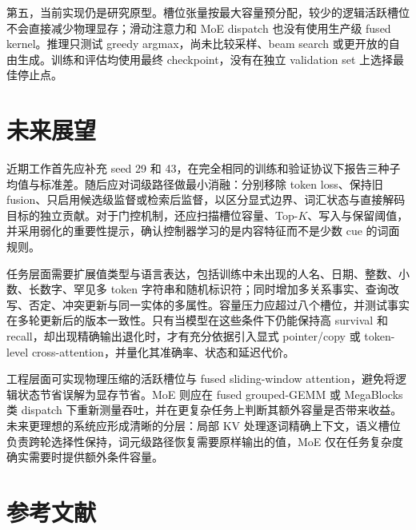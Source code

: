 \documentclass[letterpaper]{article}
\begin{document}
第五，当前实现仍是研究原型。槽位张量按最大容量预分配，较少的逻辑活跃槽位不会直接减少物理显存；滑动注意力和 MoE dispatch 也没有使用生产级 fused kernel。推理只测试 greedy argmax，尚未比较采样、beam search 或更开放的自由生成。训练和评估均使用最终 checkpoint，没有在独立 validation set 上选择最佳停止点。

\section{未来展望}

近期工作首先应补充 seed 29 和 43，在完全相同的训练和验证协议下报告三种子均值与标准差。随后应对词级路径做最小消融：分别移除 token loss、保持旧 fusion、只启用候选级监督或检索后监督，以区分显式边界、词汇状态与直接解码目标的独立贡献。对于门控机制，还应扫描槽位容量、Top-$K$、写入与保留阈值，并采用弱化的重要性提示，确认控制器学习的是内容特征而不是少数 cue 的词面规则。

任务层面需要扩展值类型与语言表达，包括训练中未出现的人名、日期、整数、小数、长数字、罕见多 token 字符串和随机标识符；同时增加多关系事实、查询改写、否定、冲突更新与同一实体的多属性。容量压力应超过八个槽位，并测试事实在多轮更新后的版本一致性。只有当模型在这些条件下仍能保持高 survival 和 recall，却出现精确输出退化时，才有充分依据引入显式 pointer/copy 或 token-level cross-attention，并量化其准确率、状态和延迟代价。

工程层面可实现物理压缩的活跃槽位与 fused sliding-window attention，避免将逻辑状态节省误解为显存节省。MoE 则应在 fused grouped-GEMM 或 MegaBlocks 类 dispatch 下重新测量吞吐，并在更复杂任务上判断其额外容量是否带来收益。未来更理想的系统应形成清晰的分层：局部 KV 处理逐词精确上下文，语义槽位负责跨轮选择性保持，词元级路径恢复需要原样输出的值，MoE 仅在任务复杂度确实需要时提供额外条件容量。

\section*{参考文献}
\end{document}
